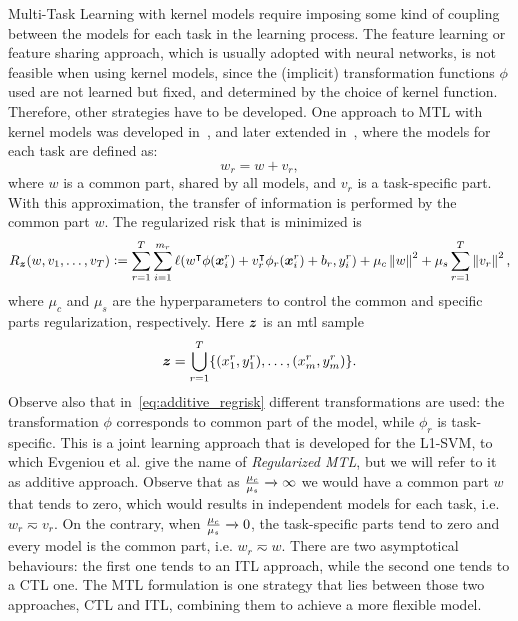 Multi-Task Learning with kernel models require imposing some kind of coupling between the models for each task in the learning process. The feature learning or feature sharing approach, which is usually adopted with neural networks, is not feasible when using kernel models, since the (implicit) transformation functions $\phi$ used are not learned but fixed, and determined by the choice of kernel function. Therefore, other strategies have to be developed. 
One approach to MTL with kernel models was developed in~\cite{EvgeniouP04}, and later extended in~\citet{CaiC09, CaiC12}, where the models for each task are defined as:
\begin{equation}
    \nonumber
    {w}_r = {w} + {v}_r,
\end{equation} 
where $w$ is a common part, shared by all models, and $v_r$ is a task-specific part. With this approximation, the transfer of information is performed by the common part ${w}$.
The regularized risk that is minimized is 
\begin{equation}
    \label{eq:additive_regrisk}
    \risk_{\bsample} ({w, v_1, \ldots, v_\ntasks}) \defeq \sum_{r=1}^{\ntasks} \sum_{i=1}^{\npertask_r} \lossf({w}^\intercal {\phi(\fv{x}_i^r)} + {v}_r^\intercal {\phi_r(\fv{x}_i^r)} + b_r, y_i^r) + \mu_c \norm{{w}}^2 + \mu_s \sum_{r=1}^\ntasks \norm{{v}_r}^2,
\end{equation}
where $\mu_c$ and $\mu_s$ are the hyperparameters to control the common and specific parts regularization, respectively. Here $\bm{z}$ is an \acrshort{mtl} sample $$\bm{z} = \bigcup_{r=1}^T \{(x_1^r, y_1^r), \ldots, (x_{m}^r, y_{m}^r)\}.$$
Observe also that in~\eqref{eq:additive_regrisk} different transformations are used: the transformation $\phi$ corresponds to common part of the model, while $\phi_r$ is task-specific.
%
This is a joint learning approach that is developed for the L1-SVM, to which Evgeniou et al. give the name of \emph{Regularized MTL}, but we will refer to it as {additive} approach.
%
Observe that as $\frac{\mu_c}{\mu_s} \xrightarrow[]{} \infty $ we would have a common part ${w}$ that tends to zero, which would results in independent models for each task, i.e. ${w}_r \eqsim {v}_r$. On the contrary, when $\frac{\mu_c}{\mu_s} \xrightarrow[]{} 0 $, the task-specific parts tend to zero and every model is the common part, i.e. ${w}_r \eqsim {w}$.
There are two asymptotical behaviours: the first one tends to an ITL approach, while the second one tends to a CTL one. The MTL formulation is one strategy that lies between those two approaches, CTL and ITL, combining them to achieve a more flexible model.

